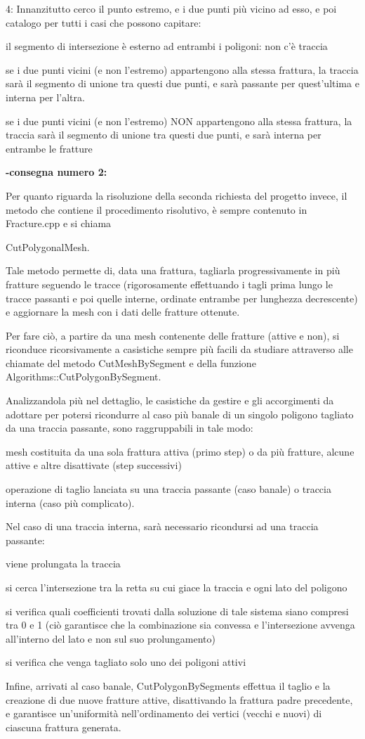 4: Innanzitutto cerco il punto estremo, e i due punti più vicino ad esso, e poi catalogo per tutti i casi che possono capitare:

il segmento di intersezione è esterno ad entrambi i poligoni: non c'è traccia

se i due punti vicini (e non l'estremo) appartengono alla stessa frattura, la traccia sarà il segmento di unione tra questi due punti, e sarà passante per quest'ultima e interna per l'altra.

se i due punti vicini (e non l'estremo) NON appartengono alla stessa frattura, la traccia sarà il segmento di unione tra questi due punti, e sarà interna per entrambe le fratture \newline

\textbf{-consegna numero 2:}


Per quanto riguarda la risoluzione della seconda richiesta del progetto invece, il metodo che contiene il procedimento risolutivo, è sempre contenuto in Fracture.cpp e si chiama

CutPolygonalMesh.


Tale metodo permette di, data una frattura, tagliarla progressivamente in più fratture seguendo le tracce (rigorosamente effettuando i tagli prima lungo le tracce passanti e poi quelle interne, ordinate entrambe per lunghezza decrescente) e aggiornare la mesh con i dati delle fratture ottenute.

Per fare ciò, a partire da una mesh contenente delle fratture (attive e non), si riconduce ricorsivamente a casistiche sempre più facili da studiare attraverso alle chiamate del metodo CutMeshBySegment e della funzione Algorithms::CutPolygonBySegment.


Analizzandola più nel dettaglio, le casistiche da gestire e gli accorgimenti da adottare per potersi ricondurre al caso più banale di un singolo poligono tagliato da una traccia passante, sono raggruppabili in tale modo:

mesh costituita da una sola frattura attiva (primo step) o da più fratture, alcune attive e altre disattivate (step successivi)

operazione di taglio lanciata su una traccia passante (caso banale) o traccia interna (caso più complicato).

Nel caso di una traccia interna, sarà necessario ricondursi ad una traccia passante:

viene prolungata la traccia

si cerca l'intersezione tra la retta su cui giace la traccia e ogni lato del poligono

si verifica quali coefficienti trovati dalla soluzione di tale sistema siano compresi tra 0 e 1 (ciò garantisce che la combinazione sia convessa e l'intersezione avvenga all'interno del lato e non sul suo prolungamento)

si verifica che venga tagliato solo uno dei poligoni attivi

Infine, arrivati al caso banale, CutPolygonBySegments effettua il taglio e la creazione di due nuove fratture attive, disattivando la frattura padre precedente, e garantisce un'uniformità nell'ordinamento dei vertici (vecchi e nuovi) di ciascuna frattura generata.
